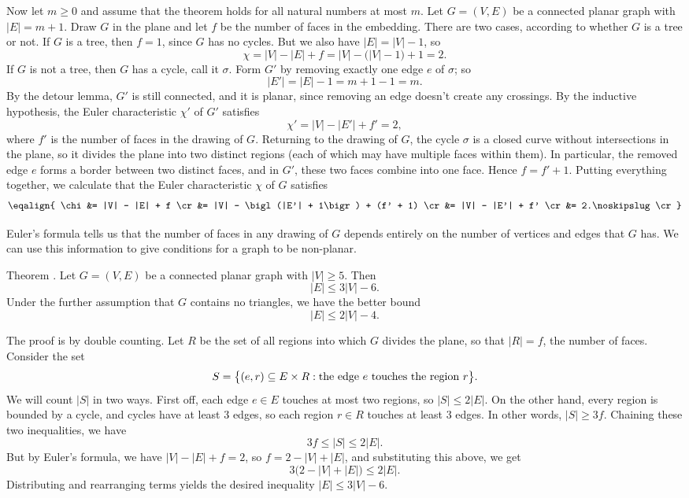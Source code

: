 Now let $m\ge 0$ and assume that the theorem holds for all natural numbers at most $m$.
Let $G = (V,E)$ be a connected planar graph with $|E| = m+1$. Draw $G$ in the plane and let
$f$ be the number of faces in the embedding. There are two cases, according to whether
$G$ is a tree or not.
If $G$ is a tree, then $f=1$, since $G$ has no cycles. But we also have $|E| = |V|-1$, so
$$\chi = |V|-|E|+f = |V|-\bigl(|V|-1\bigr) + 1 = 2.$$
If $G$ is not a tree, then $G$ has a cycle, call it $\sigma$. Form $G'$ by removing
exactly one edge $e$ of $\sigma$; so
$$ |E'| = |E| - 1 = m+1-1 = m.$$
By the detour lemma, $G'$ is still connected, and it is planar, since removing an edge doesn't
create any crossings. By the inductive hypothesis, the Euler characteristic $\chi'$ of $G'$
satisfies
$$\chi' = |V| - |E'| + f' = 2,$$
where $f'$ is the number of faces in the drawing of $G$. Returning to the drawing
of $G$, the cycle $\sigma$ is a closed curve without intersections in the plane, so
it divides the plane into two distinct regions (each of which may have multiple faces within them).
In particular, the removed edge $e$ forms a border between two distinct faces, and in $G'$,
these two faces combine into one face. Hence $f = f'+1$. Putting everything together,
we calculate that the Euler characteristic $\chi$ of $G$ satisfies
$$\eqalign{
\chi &= |V| - |E| + f \cr
&= |V| - \bigl(|E'| + 1\bigr) + (f' + 1) \cr
&= |V| - |E'| + f' \cr
&= 2.\noskipslug\cr
}$$

Euler's formula tells us that the number of faces in any drawing of $G$ depends entirely on
the number of vertices and edges that $G$ has. We can use this information to give conditions
for a graph to be non-planar.

\edef\thmnonplanarconditions{\the\thmcount}
\proclaim Theorem \advthm. Let $G = (V,E)$ be a connected planar graph with $|V|\ge 5$. Then
$$|E| \le 3|V| - 6.$$
Under the further assumption that $G$ contains no triangles, we have the better bound
$$|E| \le 2|V| - 4.$$

\proof The proof is by double counting. Let $R$ be the set of all regions into which $G$
divides the plane, so that $|R| = f$, the number of faces. Consider the set
$$S = \bigl\{ (e, r) \subseteq E\times R : \hbox{the edge}\ e\ \hbox{touches the region}\ r\bigr\}.$$
We will count $|S|$ in two ways. First off, each edge $e\in E$ touches at most two regions,
so $|S|\le 2|E|$. On the other hand, every region is bounded by a cycle, and cycles
have at least $3$ edges, so each region $r\in R$ touches at least $3$ edges. In other words,
$|S|\ge 3f$. Chaining these two inequalities, we have
$$3f \le |S| \le 2|E|.$$
But by Euler's formula, we have $|V| - |E| + f = 2$, so $f = 2-|V|+|E|$, and substituting this above,
we get
$$3\bigl( 2-|V|+|E|\bigr) \le 2|E|.$$
Distributing and rearranging terms yields the desired inequality $|E| \le 3|V|-6$.

